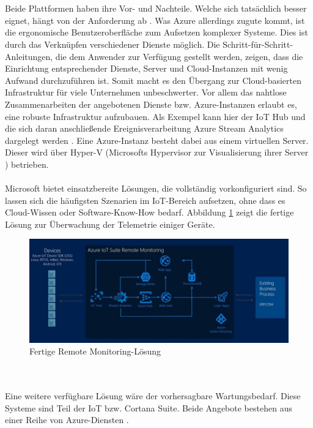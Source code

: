\\ \\Beide Plattformen haben ihre Vor- und Nachteile. Welche sich tatsächlich besser eignet, hängt von der Anforderung ab \cite{PeterTsai.2016}. Was Azure allerdings zugute kommt, ist die ergonomische Benutzeroberfläche zum Aufsetzen komplexer Systeme. Dies ist durch das Verknüpfen verschiedener Dienste möglich. Die Schritt-für-Schritt-Anleitungen, die dem Anwender zur Verfügung gestellt werden, zeigen, dass die Einrichtung entsprechender Dienste, Server und Cloud-Instanzen mit wenig Aufwand durchzuführen ist. Somit macht es den Übergang zur Cloud-basierten Infrastruktur für viele Unternehmen unbeschwerter. Vor allem das nahtlose Zusammenarbeiten der angebotenen Dienste bzw. Azure-Instanzen erlaubt es, eine robuste Infrastruktur aufzubauen. Als Exempel kann hier der IoT Hub und die sich daran anschließende Ereignisverarbeitung Azure Stream Analytics dargelegt werden \cite{PeterTsai.2016}. Eine Azure-Instanz besteht dabei aus einem virtuellen Server. Dieser wird über Hyper-V (Microsofts Hypervisor zur Visualisierung ihrer Server \cite{searchdatacenter.2017}) betrieben.\\ \\
Microsoft bietet einsatzbereite Lösungen, die vollständig vorkonfiguriert sind. So lassen sich die häufigsten Szenarien im IoT-Bereich aufsetzen, ohne dass es Cloud-Wissen oder Software-Know-How bedarf. Abbildung \ref{fig:remote_monitor} zeigt die fertige Lösung zur Überwachung der Telemetrie einiger Geräte.
\begin{figure}[ht!]
	\centering
	\includegraphics[width=1.0\linewidth]{images/remote_monitor}
	\caption{Fertige Remote Monitoring-Lösung \cite{Azure.2017}} %
	\label{fig:remote_monitor}
\end{figure}
\\ \\Eine weitere verfügbare Lösung wäre der vorhersagbare Wartungsbedarf. Diese Systeme sind Teil der IoT bzw. Cortana Suite. Beide Angebote bestehen aus einer Reihe von Azure-Diensten \cite{PeterTsai.2016}.  
 
